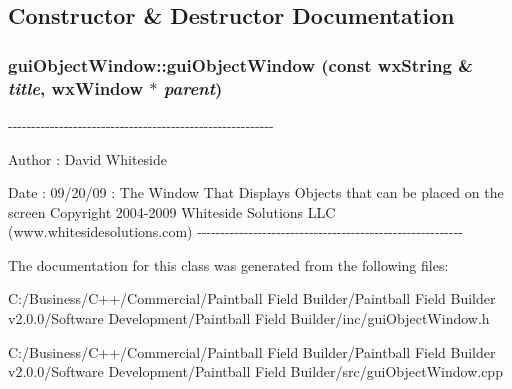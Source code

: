 \subsection{Constructor \& Destructor Documentation}
\hypertarget{classgui_object_window_adbde6fa2d8c520916ed396bac926fc0d}{
\subsubsection[{guiObjectWindow}]{\setlength{\rightskip}{0pt plus 5cm}guiObjectWindow::guiObjectWindow (const wxString \& {\em title}, \/  wxWindow $\ast$ {\em parent})}}
\label{classgui_object_window_adbde6fa2d8c520916ed396bac926fc0d}
-\/-\/-\/-\/-\/-\/-\/-\/-\/-\/-\/-\/-\/-\/-\/-\/-\/-\/-\/-\/-\/-\/-\/-\/-\/-\/-\/-\/-\/-\/-\/-\/-\/-\/-\/-\/-\/-\/-\/-\/-\/-\/-\/-\/-\/-\/-\/-\/-\/-\/-\/-\/-\/-\/-\/-\/-\/ \begin{DoxyAuthor}{Author}
: David Whiteside 
\end{DoxyAuthor}
\begin{DoxyDate}{Date}
: 09/20/09 : The Window That Displays Objects that can be placed on the screen Copyright 2004-\/2009 Whiteside Solutions LLC (www.whitesidesolutions.com) -\/-\/-\/-\/-\/-\/-\/-\/-\/-\/-\/-\/-\/-\/-\/-\/-\/-\/-\/-\/-\/-\/-\/-\/-\/-\/-\/-\/-\/-\/-\/-\/-\/-\/-\/-\/-\/-\/-\/-\/-\/-\/-\/-\/-\/-\/-\/-\/-\/-\/-\/-\/-\/-\/-\/-\/-\/ 
\end{DoxyDate}


The documentation for this class was generated from the following files:\begin{DoxyCompactItemize}
\item 
C:/Business/C++/Commercial/Paintball Field Builder/Paintball Field Builder v2.0.0/Software Development/Paintball Field Builder/inc/guiObjectWindow.h\item 
C:/Business/C++/Commercial/Paintball Field Builder/Paintball Field Builder v2.0.0/Software Development/Paintball Field Builder/src/guiObjectWindow.cpp\end{DoxyCompactItemize}
